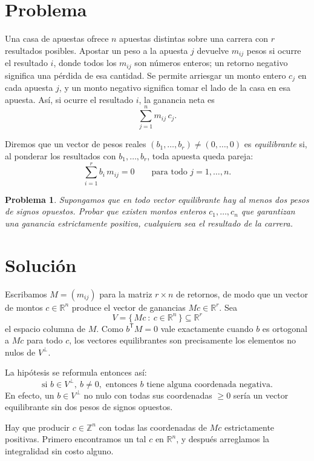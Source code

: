 \documentclass[11pt]{amsproc}
\newtheorem*{problema}{Problema}
\newcommand{\R}{\mathbb{R}}
\newcommand{\Z}{\mathbb{Z}}
\begin{document}
\section*{Problema}

Una casa de apuestas ofrece $n$ apuestas distintas sobre una carrera con $r$
resultados posibles. Apostar un peso a la apuesta $j$ devuelve $m_{ij}$ pesos si
ocurre el resultado $i$, donde todos los $m_{ij}$ son números enteros; un retorno
negativo significa una pérdida de esa cantidad. Se permite arriesgar un monto entero
$c_j$ en cada apuesta $j$, y un monto negativo significa tomar el lado de la casa en
esa apuesta. Así, si ocurre el resultado $i$, la ganancia neta es
\[
  \sum_{j=1}^{n} m_{ij}\,c_j .
\]

Diremos que un vector de pesos reales $(b_1,\dots,b_r)\neq(0,\dots,0)$ es
\emph{equilibrante} si, al ponderar los resultados con $b_1,\dots,b_r$, toda apuesta
queda pareja:
\[
  \sum_{i=1}^{r} b_i\, m_{ij}=0
  \qquad\text{para todo } j=1,\dots,n .
\]

\begin{problema}
Supongamos que en todo vector equilibrante hay al menos dos pesos de signos
opuestos. Probar que existen montos enteros $c_1,\dots,c_n$ que garantizan una
ganancia estrictamente positiva, cualquiera sea el resultado de la carrera.
\end{problema}

\section*{Solución}

Escribamos $M=(m_{ij})$ para la matriz $r\times n$ de retornos, de modo que un vector
de montos $c\in\R^n$ produce el vector de ganancias $Mc\in\R^r$. Sea
\[
  V=\{\,Mc\ :\ c\in\R^n\,\}\subseteq\R^r
\]
el espacio columna de $M$. Como $b^{\mathsf T}M=0$ vale exactamente cuando $b$ es
ortogonal a $Mc$ para todo $c$, los vectores equilibrantes son precisamente los
elementos no nulos de $V^{\perp}$.

La hipótesis se reformula entonces así:
\begin{equation}\label{eq:hyp}
  \text{si } b\in V^{\perp},\ b\neq 0, \text{ entonces } b \text{ tiene alguna coordenada negativa.}
\end{equation}
En efecto, un $b\in V^\perp$ no nulo con todas sus coordenadas $\ge 0$ sería un
vector equilibrante sin dos pesos de signos opuestos.

Hay que producir $c\in\Z^n$ con todas las coordenadas de $Mc$ estrictamente
positivas. Primero encontramos un tal $c$ en $\R^n$, y después arreglamos la
integralidad sin costo alguno.
\end{document}
